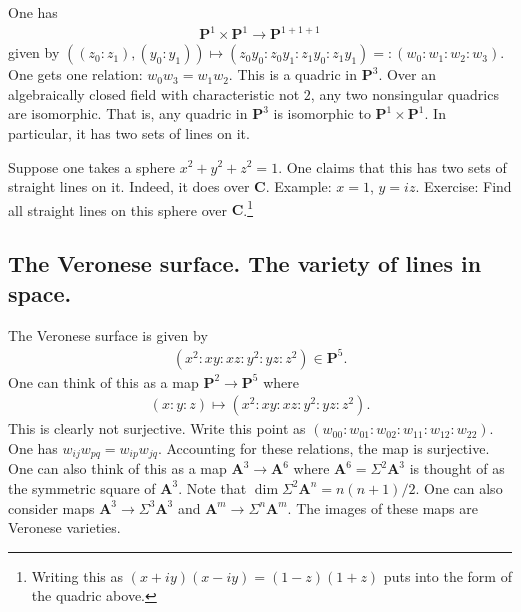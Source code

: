 \documentclass [11 pt, oneside] {article}
\begin{document}
\begin{example}\label{seg}
One has
\begin{align*}
	\mathbf{P}^1\times \mathbf{P}^1\longrightarrow \mathbf{P}^{1+1+1}
\end{align*}
given by $((z_0:z_1), (y_0:y_1)) \longmapsto (z_0y_0:z_0y_1: z_1y_0: z_1y_1) =:(w_0:w_1:w_2:w_3)$. One gets one relation: $w_0w_3=w_1w_2$. This is a quadric in $\mathbf{P}^3$. Over an algebraically closed field with characteristic not $2$, any two nonsingular quadrics are isomorphic. That is, any quadric in $\mathbf{P}^3$ is isomorphic to $\mathbf{P}^1\times \mathbf{P}^1$. In particular, it has two sets of lines on it. 

Suppose one takes a sphere $x^2+y^2+z^2=1$. One claims that this has two sets of straight lines on it. Indeed, it does over $\mathbf{C}$. Example: $x=1$, $y=iz$. Exercise: Find all straight lines on this sphere over $\mathbf{C}$.\footnote{Writing this as $(x+iy) (x-iy)= (1-z) (1+z)$ puts into the form of the quadric above.}
\end{example}


\subsection{The Veronese surface. The variety of lines in space.}

\begin{example}\label{}
 The Veronese surface is given by
\begin{align*}
	(x^2:xy:xz:y^2:yz:z^2)\in  \mathbf{P}^5.
\end{align*}
One can think of this as a map $\mathbf{P}^2\longrightarrow \mathbf{P}^5$ where
\begin{align*}
	(x:y:z) \longmapsto (x^2:xy:xz:y^2:yz:z^2).	
\end{align*}
This is clearly not surjective. Write this point as $(w_{00}:w_{01}:w_{02}:w_{11}:w_{12}:w_{22})$. One has $w_{ij}w_{pq} = w_{ip}w_{jq}$. Accounting for these relations, the map is surjective. One can also think of this as a map $\mathbf{A}^3\longrightarrow \mathbf{A}^6$ where $\mathbf{A}^6 = \Sigma^2\mathbf{A}^3$ is thought of as the symmetric square of $\mathbf{A}^3$. Note that $\dim \Sigma^2\mathbf{A}^n = n(n+1)/2$. One can also consider maps $\mathbf{A}^3\longrightarrow \Sigma^3 \mathbf{A}^3$ and $\mathbf{A}^m \longrightarrow \Sigma^n \mathbf{A}^m$. The images of these maps are Veronese varieties.
\end{example}
\end{document}
